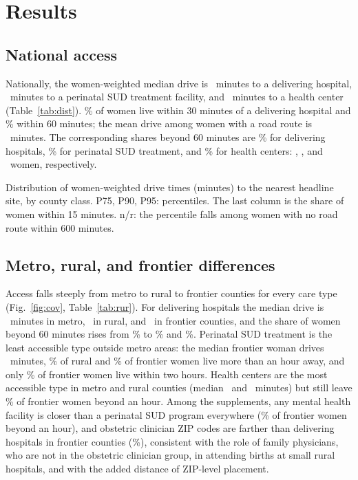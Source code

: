 \documentclass[10pt,twocolumn,letterpaper]{article}
\begin{document}
\section{Results}\label{sec:results}

\subsection{National access}
Nationally, the women-weighted median drive is \OBAllMedian\ minutes to a delivering hospital, \PPWAllMedian\ minutes to a perinatal SUD treatment facility, and \HCAllMedian\ minutes to a health center (Table~\ref{tab:dist}). \OBWithinThirtyNat\% of women live within 30 minutes of a delivering hospital and \OBWithinSixtyNat\% within 60 minutes; the mean drive among women with a road route is \OBMeanNat\ minutes. The corresponding shares beyond 60 minutes are \OBAllSixty\% for delivering hospitals, \PPWAllSixty\% for perinatal SUD treatment, and \HCAllSixty\% for health centers: \OBAllWomenSixty, \PPWAllWomenSixty, and \HCAllWomenSixty\ women, respectively.

\begin{table}[tbp]
\centering\footnotesize
\caption{Distribution of women-weighted drive times (minutes) to the nearest headline site, by county class. P75, P90, P95: percentiles. The last column is the share of women within 15 minutes. n/r: the percentile falls among women with no road route within 600 minutes.}\label{tab:dist}
\begin{adjustbox}{max width=\columnwidth}\end{adjustbox}
\end{table}

\subsection{Metro, rural, and frontier differences}
Access falls steeply from metro to rural to frontier counties for every care type (Fig.~\ref{fig:cov}, Table~\ref{tab:rur}). For delivering hospitals the median drive is \OBMetroMedian\ minutes in metro, \OBRuralMedian\ in rural, and \OBFrontierMedian\ in frontier counties, and the share of women beyond 60 minutes rises from \OBMetroSixty\% to \OBRuralSixty\% and \OBFrontierSixty\%. Perinatal SUD treatment is the least accessible type outside metro areas: the median frontier woman drives \PPWFrontierMedian\ minutes, \PPWRuralSixty\% of rural and \PPWFrontierSixty\% of frontier women live more than an hour away, and only \PPWFrontierWithinOneTwenty\% of frontier women live within two hours. Health centers are the most accessible type in metro and rural counties (median \HCMetroMedian\ and \HCRuralMedian\ minutes) but still leave \HCFrontierSixty\% of frontier women beyond an hour. Among the supplements, any mental health facility is closer than a perinatal SUD program everywhere (\MHFrontierSixty\% of frontier women beyond an hour), and obstetric clinician ZIP codes are farther than delivering hospitals in frontier counties (\OBCFrontierSixty\%), consistent with the role of family physicians, who are not in the obstetric clinician group, in attending births at small rural hospitals, and with the added distance of ZIP-level placement.
\end{document}
